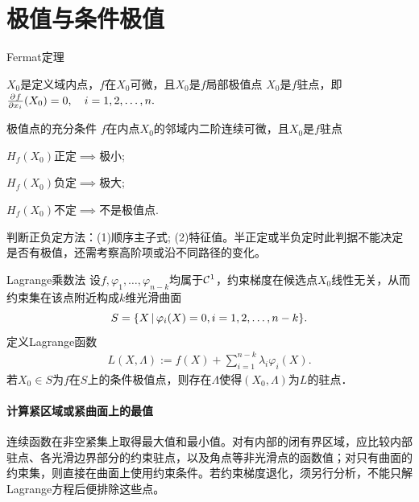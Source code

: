 \section{极值与条件极值}
\begin{theorem}{Fermat定理}{}
	\begin{center}
		$X_0$是定义域内点，$f$在$X_0$可微，且$X_0$是$f$局部极值点
		\vimplies
		$X_0$是$f$驻点，即$\frac{\partial^{}f}{\partial{x_i}^{}}(X_0) = 0,\quad i = 1,2,\ldots,n.$
	\end{center}
\end{theorem}
\begin{theorem}{极值点的充分条件}{}
	$f$在内点$X_0$的邻域内二阶连续可微，且$X_0$是$f$驻点
	\begin{compactenum}[(1)]
		\item $H_f(X_0)$正定$\implies$极小;
		\item $H_f(X_0)$负定$\implies$极大;
		\item $H_f(X_0)$不定$\implies$不是极值点.
	\end{compactenum}
	判断正负定方法：(1)顺序主子式; (2)特征值。半正定或半负定时此判据不能决定是否有极值，还需考察高阶项或沿不同路径的变化。
\end{theorem}
\begin{theorem}{Lagrange乘数法}{}
	设$f,\varphi_1,\ldots,\varphi_{n-k}$均属于$\mathcal{C}^1$，约束梯度在候选点$X_0$线性无关，从而约束集在该点附近构成$k$维光滑曲面
	\[
		S = \{X\,\vert\,\varphi_i(X) = 0,i = 1,2,\ldots,n - k\}.
	\]
	定义Lagrange函数
	\begin{align}
		L(X,\varLambda) := f(X) + \sum_{i=1}^{n-k}\lambda_i\varphi_i(X).
	\end{align}
	若$X_0 \in S$为$f$在$S$上的条件极值点，则存在$\varLambda$使得$(X_0,\varLambda)$为$L$的驻点．
\end{theorem}
\paragraph{计算紧区域或紧曲面上的最值}
连续函数在非空紧集上取得最大值和最小值。对有内部的闭有界区域，应比较内部驻点、各光滑边界部分的约束驻点，以及角点等非光滑点的函数值；对只有曲面的约束集，则直接在曲面上使用约束条件。若约束梯度退化，须另行分析，不能只解Lagrange方程后便排除这些点。
\newpage
